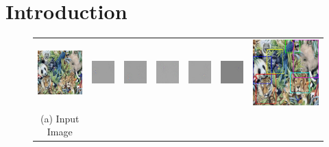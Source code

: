 \section{Introduction}

\setlength{\tabcolsep}{2pt}
\begin{figure}
\begin{center}
\begin{tabular}{ccccccc}
\includegraphics[width=0.13\linewidth]{figs/splash/original} &
\includegraphics[width=0.13\linewidth]{figs/splash/panda} &
\includegraphics[width=0.13\linewidth]{figs/splash/tiger} &
\includegraphics[width=0.13\linewidth]{figs/splash/gorilla} &
\includegraphics[width=0.13\linewidth]{figs/splash/lion} &
\includegraphics[width=0.13\linewidth]{figs/splash/elephant} &
\includegraphics[width=0.13\linewidth]{figs/splash/localization}\\
{\small (a) Input Image} &

\end{tabular}
\end{center}
\end{figure}
